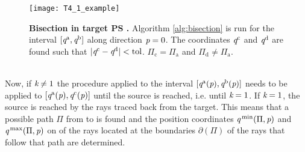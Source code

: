 \begin{figure}[h]
  \begin{center}
  \texttt{[image: T4\_1\_example]}
  \end{center}
  \caption{\textbf{Bisection in target PS .} Algorithm \ref{alg:bisection} is run for the interval $[\textit{q}^{\textrm{a}}, \textit{q}^{\textrm{b}}]$ along direction $\textit{p}=0$. The coordinates $\textit{q}^{\textrm{c}}$ and $\textit{q}^{\textrm{d}}$ are found such that 
$|\textit{q}^{\textrm{c}}-\textit{q}^{\textrm{d}}|<\textrm{tol}$. $\Pi_{\textrm{c}}= \Pi_{\textrm{a}}$ and $\Pi_{\textrm{d}}\neq \Pi_{\textrm{a}}$.}
\label{fig:bisec}
 \end{figure}
\\ \indent Now, if $\textit{k}\neq1$ the procedure applied to the interval 
$[\textit{q}^{\textrm{a}}(\textit{p}), \textit{q}^{\textrm{b}}(\textit{p})]$ needs to be applied to $[\textit{q}^{\textrm{a}}(\textit{p}),\textit{q}^{\textrm{c}}(\textit{p})]$ until the source is reached, i.e. until $\textit{k}=1$. If $\textit{k}=1$, the source is reached by the rays traced back from the target. This means that a possible path $\Pi$ from  to  is found and the position coordinates $\textit{q}^{\textrm{\,min}}(\Pi, \textit{p})$ and $\textit{q}^{\textrm{\,max}}(\Pi, \textit{p})$ on  of the rays located at the boundaries $\partial$$(\Pi)$ of the rays that follow that path are determined. \\ \indent 
